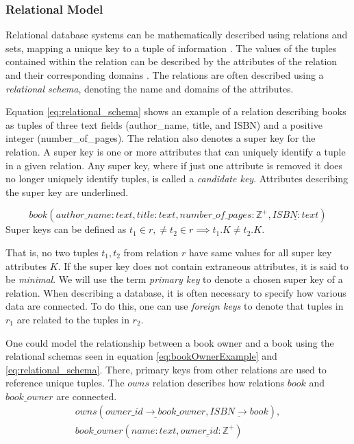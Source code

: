 \subsubsection*{Relational Model}
Relational database systems can be mathematically described using relations and sets, mapping a unique key to a tuple of information \cite{DBSBook}.
The values of the tuples contained within the relation can be described by the attributes of the relation and their corresponding domains \cite{KatjaFirstPP}. 
The relations are often described using a \textit{relational schema}, denoting the name and domains of the attributes.


Equation \ref{eq:relational_schema} shows an example of a relation describing books as tuples of three text fields (author\_name, title, and ISBN) and a positive integer (number\_of\_pages).
The relation also denotes a super key for the relation. A super key is one or more attributes that can uniquely identify a tuple in a given relation.
Any super key, where if just one attribute is removed it does no longer uniquely identify tuples, is called a \textit{candidate key}.
Attributes describing the super key are underlined.

\begin{equation} \label{eq:relational_schema}
    book(author\_name:text, title: text, number\_of\_pages:\mathbb{Z}^+, \underline{ISBN: text})
\end{equation}
Super keys can be defined as $t_1 \in r,\neq t_2 \in r \implies t_1.K \neq t_2.K$. 

That is, no two tuples $t_1, t_2$ from relation $r$ have same values for all super key attributes $K$. 
If the super key does not contain extraneous attributes, it is said to be \textit{minimal}. \cite{DBSBook}
We will use the term \textit{primary key} to denote a chosen super key of a relation. 
When describing a database, it is often necessary to specify how various data are connected. 
To do this, one can use \textit{foreign keys} to denote that tuples in $r_1$ are related to the tuples in $r_2$.


One could model the relationship between a book owner and a book using the relational schemas seen in equation \ref{eq:bookOwnerExample} and \ref{eq:relational_schema}.
There, primary keys from other relations are used to reference unique tuples. The $owns$ relation describes how relations $book$ and $book\_owner$ are connected. 
\begin{equation}\label{eq:bookOwnerExample}
    \begin{split}
        owns(\underline{owner\_id \rightarrow book\_owner}, \underline{ISBN \rightarrow book}), \\
        book\_owner(name:text,\underline{owner\_id:\mathbb{Z}^+})
    \end{split}
\end{equation}


